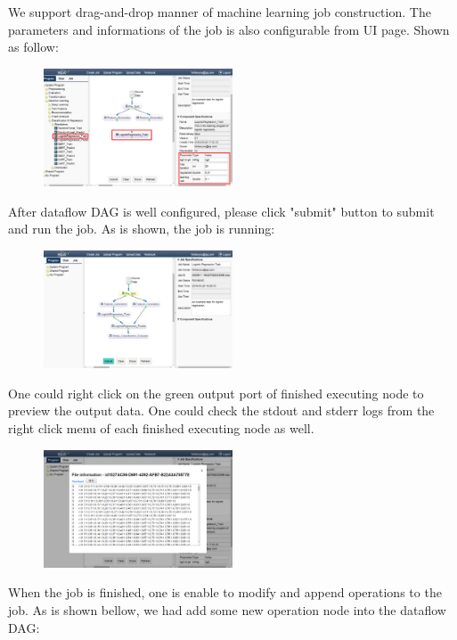 \documentclass{sig-alternate-05-2015}
\begin{document}
We support drag-and-drop manner of machine learning job construction. The parameters and informations of the job is also configurable from UI page. Shown as follow:
\begin{figure}[!htb]
\centering
\includegraphics[width = 0.5\textwidth]{job_construct.eps}
\end{figure}

After dataflow DAG is well configured, please click "submit" button to submit and run the job. As is shown, the job is running:

\begin{figure}[!htb]
\centering
\includegraphics[width = 0.5\textwidth]{job_submit.eps}
\end{figure}

One could right click on the green output port of finished executing node to preview the output data. One could check the stdout and stderr logs from the right click menu of each finished executing node as well.

\begin{figure}[!htb]
\centering
\includegraphics[width = 0.5\textwidth]{job_data_output.eps}
\end{figure}

When the job is finished, one is enable to modify and append operations to the job. As is shown bellow, we had add some new operation node into the dataflow DAG:
\end{document}
